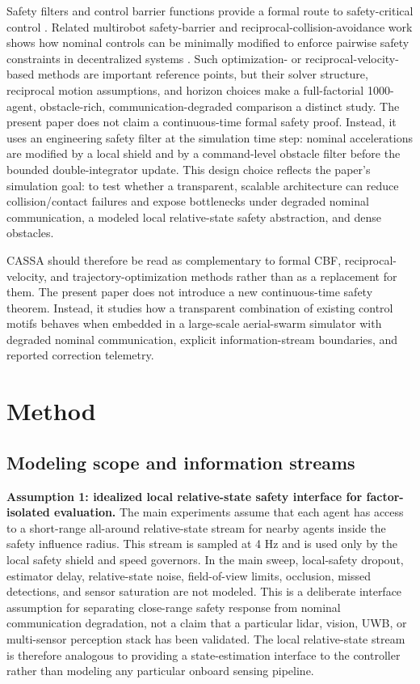 \documentclass[11pt]{article}
\begin{document}
Safety filters and control barrier functions provide a formal route to safety-critical control \cite{ames2017cbf}. Related multirobot safety-barrier and reciprocal-collision-avoidance work shows how nominal controls can be minimally modified to enforce pairwise safety constraints in decentralized systems \cite{wang2017safety,bareiss2015generalized}. Such optimization- or reciprocal-velocity-based methods are important reference points, but their solver structure, reciprocal motion assumptions, and horizon choices make a full-factorial 1000-agent, obstacle-rich, communication-degraded comparison a distinct study. The present paper does not claim a continuous-time formal safety proof. Instead, it uses an engineering safety filter at the simulation time step: nominal accelerations are modified by a local shield and by a command-level obstacle filter before the bounded double-integrator update. This design choice reflects the paper's simulation goal: to test whether a transparent, scalable architecture can reduce collision/contact failures and expose bottlenecks under degraded nominal communication, a modeled local relative-state safety abstraction, and dense obstacles.

CASSA should therefore be read as complementary to formal CBF, reciprocal-velocity, and trajectory-optimization methods rather than as a replacement for them. The present paper does not introduce a new continuous-time safety theorem. Instead, it studies how a transparent combination of existing control motifs behaves when embedded in a large-scale aerial-swarm simulator with degraded nominal communication, explicit information-stream boundaries, and reported correction telemetry.

\section{Method}

\subsection{Modeling scope and information streams}

\textbf{Assumption 1: idealized local relative-state safety interface for factor-isolated evaluation.} The main experiments assume that each agent has access to a short-range all-around relative-state stream for nearby agents inside the safety influence radius. This stream is sampled at 4 Hz and is used only by the local safety shield and speed governors. In the main sweep, local-safety dropout, estimator delay, relative-state noise, field-of-view limits, occlusion, missed detections, and sensor saturation are not modeled. This is a deliberate interface assumption for separating close-range safety response from nominal communication degradation, not a claim that a particular lidar, vision, UWB, or multi-sensor perception stack has been validated. The local relative-state stream is therefore analogous to providing a state-estimation interface to the controller rather than modeling any particular onboard sensing pipeline.
\end{document}
